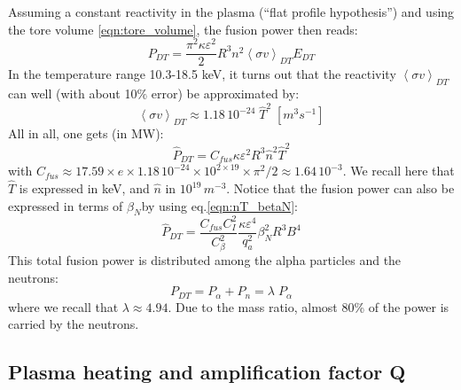 Assuming a constant reactivity in the plasma (``flat profile hypothesis'') and using the tore volume \ref{eqn:tore_volume}, the fusion power then reads:
\begin{equation}
  P_{DT} = \frac{\pi^2 \kappa \varepsilon^2}{2} 
  R^3 n^2 \left< \sigma v \right>_{DT} E_{DT}
\end{equation}
In the temperature range 10.3-18.5 keV, it turns out that the reactivity $\left< \sigma v \right>_{DT}$ can well (with about 10$\%$ error) be approximated by\cite[(1.5.4)]{Wesson2004}: 
\begin{equation}
  \left< \sigma v \right>_{DT} \approx 1.18\, 10^{-24}\; \hat T^2 \;\si{\left[m^3 s^{-1}\right]}
\end{equation}
All in all, one gets (in MW):
\begin{equation}
  \hat P_{DT} = C_{fus} \kappa \varepsilon^2 R^3 \hat n^2 \hat T^2  
\label{eq:DT_fusion_power}
\end{equation}
with $C_{fus} \approx 17.59 \times e\times 1.18\, 10^{-24} \times 10^{2\times19}\times \pi^2/2 \approx 1.64\, 10^{-3}$. We recall here that $\hat T$ is expressed in keV, and $\hat n$ in $10^{19} \, \si{m^{-3}}$. 
Notice that the fusion power can also be expressed in terms of $\beta_N$by using eq.\ref{eqn:nT_betaN}:
\begin{equation}
  \hat P_{DT} = \frac{C_{fus}C_I^2}{C_\beta^2} \frac{\kappa \varepsilon^4}{q_a^2} 
    \beta_N^2 R^3 B^4 
\label{eq:DT_fusion_power_betaN}
\end{equation}
This total fusion power is distributed among the alpha particles and the neutrons: 
\begin{equation}
  P_{DT} = P_\alpha + P_n = \lambda \; P_\alpha
\end{equation}
where we recall that $\lambda \approx 4.94$. Due to the mass ratio, almost 80\% of the power is carried by the neutrons. 

\subsection{Plasma heating and amplification factor Q}

